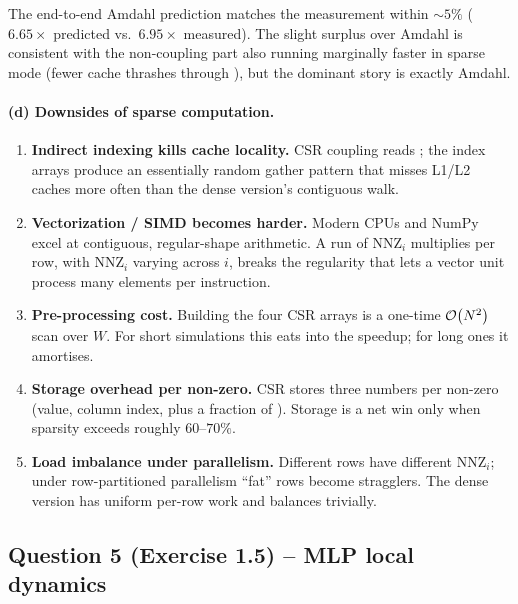 \documentclass[11pt, a4paper]{article}
\begin{document}
The end-to-end Amdahl prediction matches the measurement within
$\sim 5\%$ ($6.65\times$ predicted vs.\ $6.95\times$ measured). The
slight surplus over Amdahl is consistent with the non-coupling part also
running marginally faster in sparse mode (fewer cache thrashes through
), but the dominant story is exactly Amdahl.

\paragraph{(d) Downsides of sparse computation.}
\begin{enumerate}
\itemsep0em
\item \textbf{Indirect indexing kills cache locality.} CSR coupling
      reads ; the index
      arrays produce an essentially random gather pattern that misses
      L1/L2 caches more often than the dense version's contiguous walk.
\item \textbf{Vectorization / SIMD becomes harder.} Modern CPUs and
      NumPy excel at contiguous, regular-shape arithmetic. A run of
      $\mathrm{NNZ}_i$ multiplies per row, with $\mathrm{NNZ}_i$ varying
      across $i$, breaks the regularity that lets a vector unit process
      many elements per instruction.
\item \textbf{Pre-processing cost.} Building the four CSR arrays is a
      one-time $\mathcal{O}\!\left(N^2\right)$ scan over $W$. For short simulations this
      eats into the speedup; for long ones it amortises.
\item \textbf{Storage overhead per non-zero.} CSR stores three numbers
      per non-zero (value, column index, plus a fraction of
      ). Storage is a net win only when sparsity
      exceeds roughly $60$--$70\%$.
\item \textbf{Load imbalance under parallelism.} Different rows have
      different $\mathrm{NNZ}_i$; under row-partitioned parallelism
      ``fat'' rows become stragglers. The dense version has uniform
      per-row work and balances trivially.
\end{enumerate}

\subsection{Question 5 (Exercise 1.5) -- MLP local dynamics}
\end{document}
